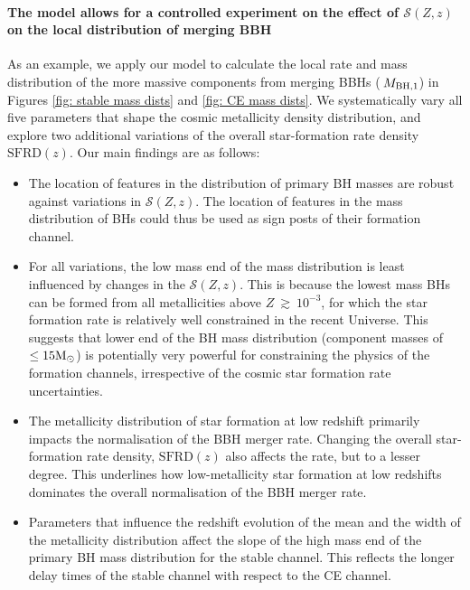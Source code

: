 \documentclass[twocolumn]{aastex631}
\newcommand{\Msun}{\ensuremath{\rm{M}_{\odot}}\xspace}
\newcommand{\Mbheen}{\ensuremath{\,M_{\rm BH, 1}}\xspace}
\newcommand{\SFRDzZ}{\ensuremath{\mathcal{S}(Z,z)}\xspace}
\newcommand{\SFRDz}{\ensuremath{\mathrm{SFRD}(z)}\xspace}
\begin{document}
\paragraph{The model allows for a controlled experiment on the effect of \SFRDzZ on the local distribution of merging BBH}
As an example, we apply our model to calculate the local rate and mass distribution of the more massive components from merging BBHs (\Mbheen) in Figures \ref{fig: stable mass dists} and \ref{fig: CE mass dists}.
We systematically vary all five parameters that shape the cosmic metallicity density distribution, and explore two additional variations of the overall star-formation rate density \SFRDz.
Our main findings are as follows:
\begin{itemize}
    
    \item The location of features in the distribution of primary BH masses are robust against variations in \SFRDzZ. The location of features in the mass distribution of BHs could thus be used as sign posts of their formation channel. 
    
    \item For all variations, the low mass end of the mass distribution is least influenced by changes in the \SFRDzZ.
    This is because the lowest mass BHs can be formed from all metallicities above $Z~\gtrsim~10^{-3}$, for which the star formation rate is relatively well constrained in the recent Universe. 
    This suggests that lower end of the BH mass distribution (component masses of $\leq 15\Msun$) is potentially very powerful for constraining the physics of the formation channels, irrespective of the cosmic star formation rate uncertainties.
    
    \item The metallicity distribution of star formation at low redshift primarily impacts the normalisation of the BBH merger rate. Changing the overall star-formation rate density, \SFRDz also affects the rate, but to a lesser degree. This underlines how low-metallicity star formation at low redshifts dominates the overall normalisation of the BBH merger rate. 
    
    \item Parameters that influence the redshift evolution of the mean and the width of the metallicity distribution affect the slope of the high mass end of the primary BH mass distribution for the stable channel. This reflects the longer delay times of the stable channel with respect to the CE channel. 
    
\end{itemize}
\end{document}
